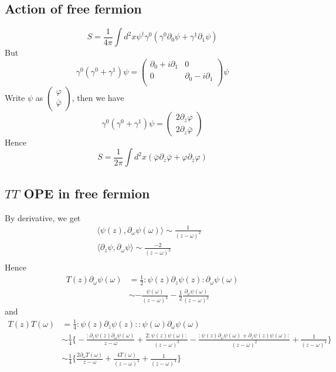 \documentclass[11pt,a4paper]{article}
\theoremstyle{definition}
\begin{document}
 \subsection{Action of free fermion}
 \[
 S = \frac{1}{4\pi} \int d^2 x \psi^\dagger \gamma^0(\gamma^0 \partial_0 \psi + \gamma^1 \partial_1 \psi)
 \]
 But
 \[
 \gamma^0(\gamma^0 + \gamma^1) \psi = \begin{pmatrix}
 \partial_0 + i \partial_1& 0 \\
 0 & \partial_0 - i \partial_1\\
 \end{pmatrix} \psi
 \]
 Write $\psi$ as $\begin{pmatrix}
 \varphi\\ \bar{\varphi}
 \end{pmatrix}$, then we have $$ \gamma^0(\gamma^0 + \gamma^1) \psi = \begin{pmatrix}
 2\partial_{\bar{z}} \varphi\\ 2 \partial_{z} \bar{\varphi}
 \end{pmatrix}$$
 Hence 
 \[
	S = \frac{1}{2\pi} \int d^2 x (\bar{\varphi} \partial_{z} \bar{\varphi} +  \varphi \partial_{\bar{z}} \varphi)
 \]
 \subsection{$TT$ OPE in free fermion}
By derivative, we get 
\[
\begin{aligned}
\langle \psi (z), \partial_\omega \psi(\omega) \rangle \sim \frac{1}{(z-\omega)^2}& \\
 \langle \partial_z \psi , \partial_\omega \psi \rangle \sim \frac{-2}{(z-\omega)^3}&\\
\end{aligned}
\]
Hence 
\[
\begin{aligned}
T(z) \partial_\omega \psi(\omega) & = \frac{1}{2} : \psi(z) \partial_z \psi(z): \partial_\omega \psi(\omega)\\
& \sim -\frac{\psi(\omega)}{(z-\omega)^3} - \frac{1}{2} \frac{\partial_\omega \psi (\omega)}{(z-\omega)^2}
\end{aligned}
\]
and 
\[
\begin{aligned}
T(z)T(\omega) &= \frac{1}{4} : \psi(z) \partial_z \psi(z) :: \psi(\omega) \partial_\omega \psi(\omega)\\
& \sim \frac{1}{4} \big\{ - \frac{:\partial_z \psi(z) \partial_\omega \psi(\omega)}{z-\omega} + \frac{2: \psi(z) \psi(\omega):}{(z-\omega)^3} - \frac{: \psi(z) \partial_\omega \psi(\omega) + \partial_z \psi(z) \psi(\omega):}{(z-\omega)^2} + \frac{1}{(z-\omega)^4} \big\}\\
&\sim \frac{1}{4} \big\{\frac{2 \partial_\omega T(\omega)}{z-\omega} + \frac{4T(\omega)}{(z-\omega)^2} + \frac{1}{(z-\omega)^4}  \big\}
\end{aligned}
\]
\end{document}
